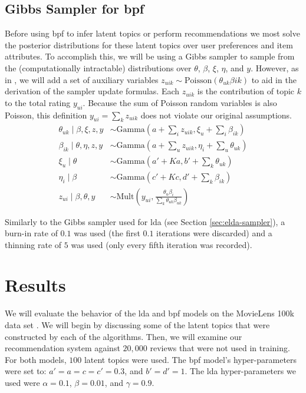 \documentclass{article} %
\begin{document}
\subsection{Gibbs Sampler for \acrlong{bpf}}
Before using \gls{bpf} to infer latent topics or perform recommendations we most solve the posterior distributions for these latent topics over user preferences and item attributes. To accomplish this, we will be using a Gibbs sampler to sample from the (computationally intractable) distributions over $\theta$, $\beta$, $\xi$, $\eta$, and $y$. However, as in \cite{gopalan2013scalable}, we will add a set of auxiliary variables $z_{uik} \sim \mathrm{Poisson} \left ( \theta_{uk} \beta{ik} \right )$ to aid in the derivation of the sampler update formulas. Each $z_{uik}$ is the contribution of topic $k$ to the total rating $y_{ui}$. Because the sum of Poisson random variables is also Poisson, this definition $y_{ui} = \sum_k z_{uik}$ does not violate our original assumptions.
\begin{align*}
	\theta_{uk} \mid \beta, \xi, z, y &\sim \mathrm{Gamma}\left(a + \sum_i z_{uik}, \xi_u + \sum_i \beta_{ik} \right) \\
	\beta_{ik} \mid \theta, \eta, z, y &\sim \mathrm{Gamma}\left (a + \sum_u z_{uik}, \eta_i + \sum_u \theta_{uk} \right ) \\
	\xi_u \mid \theta &\sim \mathrm{Gamma}\left (a' + Ka, b' + \sum_k \theta_{uk} \right ) \\
	\eta_i \mid \beta &\sim \mathrm{Gamma} \left (c' + Kc, d' + \sum_k \beta_{ik} \right ) \\
	z_{ui} \mid \beta, \theta, y &\sim \mathrm{Mult} \left (y_{ui}, \frac{\theta_u \beta_i}{\sum_k \theta_{uk} \beta_{uk}} \right )
\end{align*}

Similarly to the Gibbs sampler used for \gls{lda} (see Section \ref{sec:elda-sampler}), a burn-in rate of $0.1$ was used (the first $0.1$ iterations were discarded) and a thinning rate of $5$ was used (only every fifth iteration was recorded).

\section{Results}
We will evaluate the behavior of the \gls{lda} and \gls{bpf} models on the MovieLens 100k data set \cite{movielens100k}. We will begin by discussing some of the latent topics that were constructed by each of the algorithms. Then, we will examine our recommendation system against $20,000$ reviews that were not used in training. For both models, $100$ latent topics were used. The \gls{bpf} model's hyper-parameters were set to: $a' = a = c = c' = 0.3$, and $b' = d' = 1$. The \gls{lda} hyper-parameters we used were $\alpha = 0.1$, $\beta = 0.01$, and $\gamma = 0.9$.
\end{document}

